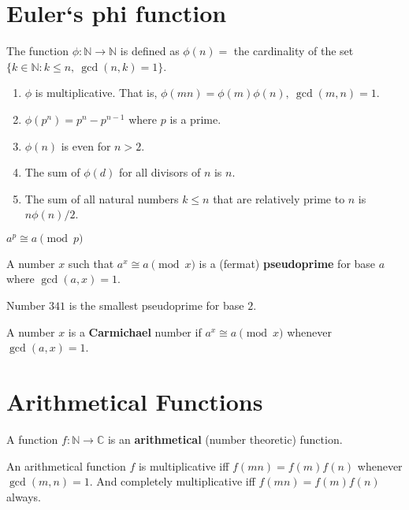 \section{Euler`s phi function}
	The function $\phi : \mathbb{N} \to \mathbb{N}$ is defined as $\phi(n) = $ the cardinality of the set $\{k \in \mathbb{N} : k \le n,\ \gcd(n,k)=1\}$.

	\begin{enumerate}
		\item $\phi$ is multiplicative. That is, $\phi(mn) = \phi(m)\phi(n),\ \gcd(m,n)=1$.
		\item $\phi(p^n) = p^n-p^{n-1}$ where $p$ is a prime.
		\item $\phi(n)$ is even for $n > 2$.
		\item The sum of $\phi(d)$ for all divisors of $n$ is $n$.
		\item The sum of all natural numbers $k \le n$ that are relatively prime to $n$ is $n\phi(n)/2$.
	\end{enumerate}

\begin{theorem}[Fermat]
	$a^p \cong a \pmod{p}$
\end{theorem}
\begin{definition}
	A number $x$ such that $a^x \cong a \pmod{x}$ is a (fermat) \textbf{pseudoprime} for base $a$ where $\gcd(a,x) = 1$.
\end{definition}
Number $341$ is the smallest pseudoprime for base $2$.

\begin{definition}
	A number $x$ is a \textbf{Carmichael} number if $a^x \cong a \pmod{x}$ whenever $\gcd(a,x)=1$.
\end{definition}

\section{Arithmetical Functions}
\begin{definition}
	A function $f : \mathbb{N} \to \mathbb{C}$ is an \textbf{arithmetical} (number theoretic) function.
\end{definition}

\begin{definition}
	An arithmetical function $f$ is multiplicative iff $f(mn) = f(m)f(n)$ whenever $\gcd(m,n) = 1$.
	And completely multiplicative iff $f(mn) = f(m)f(n)$ always.
\end{definition}

